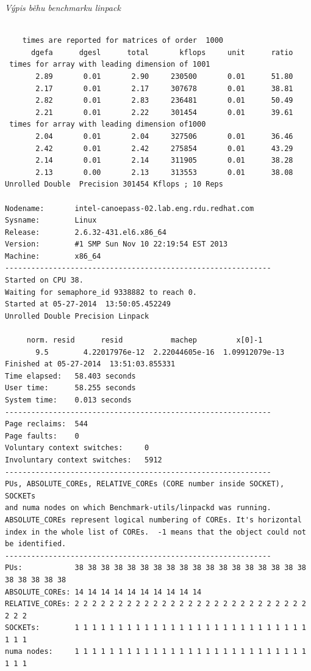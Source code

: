 \documentclass[a4paper,12pt]{article}
\begin{document}
\newpage
\noindent
\textit{Výpis běhu benchmarku linpack} \\
\begingroup
\fontsize{10pt}{12pt}\selectfont
\begin{verbatim}

    times are reported for matrices of order  1000
      dgefa      dgesl      total       kflops     unit      ratio
 times for array with leading dimension of 1001
       2.89       0.01       2.90     230500       0.01      51.80
       2.17       0.01       2.17     307678       0.01      38.81
       2.82       0.01       2.83     236481       0.01      50.49
       2.21       0.01       2.22     301454       0.01      39.61
 times for array with leading dimension of1000
       2.04       0.01       2.04     327506       0.01      36.46
       2.42       0.01       2.42     275854       0.01      43.29
       2.14       0.01       2.14     311905       0.01      38.28
       2.13       0.00       2.13     313553       0.01      38.08
Unrolled Double  Precision 301454 Kflops ; 10 Reps 

Nodename:       intel-canoepass-02.lab.eng.rdu.redhat.com
Sysname:        Linux
Release:        2.6.32-431.el6.x86_64
Version:        #1 SMP Sun Nov 10 22:19:54 EST 2013
Machine:        x86_64
-------------------------------------------------------------
Started on CPU 38.
Waiting for semaphore_id 9338882 to reach 0.
Started at 05-27-2014  13:50:05.452249
Unrolled Double Precision Linpack

     norm. resid      resid           machep         x[0]-1     
       9.5        4.22017976e-12  2.22044605e-16  1.09912079e-13
Finished at 05-27-2014  13:51:03.855331
Time elapsed:   58.403 seconds
User time:      58.255 seconds
System time:    0.013 seconds
-------------------------------------------------------------
Page reclaims:  544
Page faults:    0
Voluntary context switches:     0
Involuntary context switches:   5912
-------------------------------------------------------------
PUs, ABSOLUTE_COREs, RELATIVE_COREs (CORE number inside SOCKET), SOCKETs 
and numa nodes on which Benchmark-utils/linpackd was running.
ABSOLUTE_COREs represent logical numbering of COREs. It's horizontal
index in the whole list of COREs.  -1 means that the object could not be identified.
-------------------------------------------------------------
PUs:            38 38 38 38 38 38 38 38 38 38 38 38 38 38 38 38 38 38 38 38 38 38 38
ABSOLUTE_COREs: 14 14 14 14 14 14 14 14 14 14 
RELATIVE_COREs: 2 2 2 2 2 2 2 2 2 2 2 2 2 2 2 2 2 2 2 2 2 2 2 2 2 2 2 2 2 2 
SOCKETs:        1 1 1 1 1 1 1 1 1 1 1 1 1 1 1 1 1 1 1 1 1 1 1 1 1 1 1 1 1 1 
numa nodes:     1 1 1 1 1 1 1 1 1 1 1 1 1 1 1 1 1 1 1 1 1 1 1 1 1 1 1 1 1 1 

\end{verbatim}
\endgroup
\end{document}
